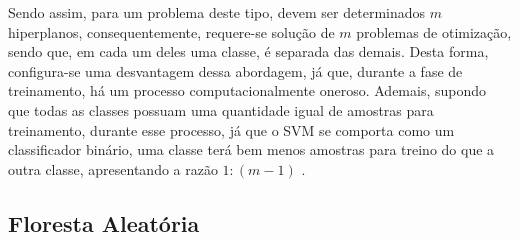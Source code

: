 Sendo assim, para um problema deste tipo, devem ser determinados $m$ hiperplanos, consequentemente, requere-se solução de $m$ problemas de otimização, sendo que, em cada um deles uma classe, é separada das demais. Desta forma, configura-se uma desvantagem dessa abordagem, já que, durante a fase de treinamento, há um processo computacionalmente oneroso. Ademais, supondo que todas as classes possuam uma quantidade igual de amostras para treinamento, durante esse processo, já que o SVM se comporta como um classificador binário, uma classe terá bem menos amostras para treino do que a outra classe, apresentando a razão $1:(m-1)$ .



\subsection{Floresta Aleatória}








